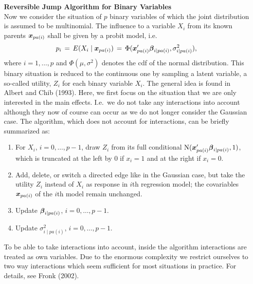 {\bf Reversible Jump Algorithm for Binary Variables}\\[0.2cm]
%
 Now we consider the
situation of $p$ binary variables of which the joint distribution
is assumed to be multinomial. The influence to a variable $X_i$
from its known parents $\mbox{\boldmath $x$}_{pa(i)}$ shall be given by a probit
model, i.e.~
\begin{eqnarray} \label{probit}
p_{i} \,=\,  E(X_{i} \mid \x_{pa(i)})
      \,=\,  \Phi (  \x_{pa(i)}'\mbeta_{i \mid pa(i)}, \sigma_{i \mid pa(i)}^2),
\end{eqnarray}
where $i=1, \dots , p$ and  $\Phi (\mu ,\sigma^2)$ denotes the cdf
of the normal distribution. This binary situation is reduced to
the continuous one by sampling a latent variable, a so-called
utility, $Z_i$ for each binary variable $X_i$. The general idea is
found in Albert and Chib (1993). Here, we first focus on the
situation that we are only interested in the main effects. I.e.~we
do not take any interactions into account although they now of
course can occur as we do not longer consider the Gaussian case.
The algorithm, which does not account for interactions, can be
briefly summarized as:
%
\begin{enumerate}
\item  For $X_i$, $i=0, \dots, p-1$, draw $Z_{i}$ from its full conditional
        $\mbox{N}(\mbox{\boldmath $x$}_{pa(i)}' \mbox{\boldmath $\beta$}_{i \mid pa(i)},1)$, which is truncated at the left by 0 if $x_{i}=1$
        and at the  right if $x_{i}=0$.
\item Add, delete, or switch a directed edge like in the Gaussian case, but take the utility $Z_i$ instead of
$X_i$ as response in $i$th regression model; the covariables
$\mbox{\boldmath $x$}_{pa(i)}$ of the $i$th model remain unchanged.
\item Update  $\mbox{\boldmath $\beta$}_{i\mid pa(i)}$, $i=0, \dots, p-1$.
\item Update $\sigma^2_{i\mid pa(i)}$, $i=0, \dots, p-1$.
\end{enumerate}

To be able to take interactions into account, inside the algorithm
interactions are treated as own variables. Due to the enormous
complexity we restrict ourselves to two way interactions which
seem sufficient for most situations in practice. For details, see
Fronk (2002).

\bigskip


